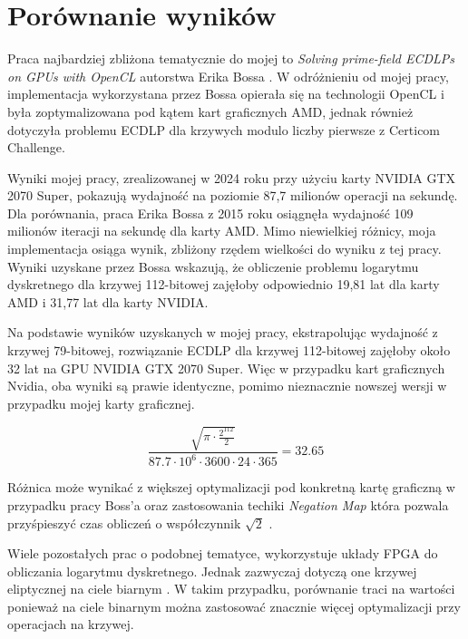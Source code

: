 \section{Porównanie wyników}

Praca najbardziej zbliżona tematycznie do mojej to \textit{Solving prime-field 
ECDLPs on GPUs with OpenCL} autorstwa Erika Bossa \cite{Boss2015}. W odróżnieniu 
od mojej pracy, implementacja wykorzystana przez Bossa opierała się na technologii 
OpenCL i była zoptymalizowana pod kątem kart graficznych AMD, jednak również 
dotyczyła problemu ECDLP dla krzywych modulo liczby pierwsze z Certicom Challenge.

Wyniki mojej pracy, zrealizowanej w 2024 roku przy użyciu karty NVIDIA GTX 2070 
Super, pokazują wydajność na poziomie 87,7 milionów operacji na sekundę. Dla 
porównania, praca Erika Bossa z 2015 roku osiągnęła wydajność 109 milionów iteracji 
na sekundę dla karty AMD.
Mimo niewielkiej różnicy, moja implementacja osiąga wynik, zbliżony rzędem wielkości do
wyniku z tej pracy.
Wyniki uzyskane przez Bossa wskazują, że obliczenie 
problemu logarytmu dyskretnego dla krzywej 112-bitowej zajęłoby odpowiednio 19,81 
lat dla karty AMD i 31,77 lat dla karty NVIDIA.

Na podstawie wyników uzyskanych w mojej pracy, ekstrapolując wydajność z krzywej 
79-bitowej, rozwiązanie ECDLP dla krzywej 112-bitowej zajęłoby około 32 lat na GPU 
NVIDIA GTX 2070 Super. Więc w przypadku kart graficznych Nvidia, oba wyniki są prawie identyczne,
pomimo nieznacznie nowszej wersji w przypadku mojej karty graficznej.

$$
\frac{\sqrt{\pi \cdot \frac{2^{112}}{2}}}{87.7 \cdot 10^{6} \cdot 3600 \cdot 24 \cdot 365} = 32.65
$$

Różnica może wynikać z większej optymalizacji pod konkretną kartę graficzną
w przypadku pracy Boss'a oraz zastosowania techiki \textit{Negation Map} która pozwala przyśpieszyć czas obliczeń
o współczynnik $\sqrt{2}$ \cite{Negation}.

Wiele pozostałych prac o podobnej tematyce,
wykorzystuje układy FPGA do obliczania logarytmu dyskretnego. Jednak zazwyczaj
dotyczą one krzywej eliptycznej na ciele biarnym \cite{Wenger2014}. W takim przypadku, porównanie traci na wartości
ponieważ na ciele binarnym można zastosować znacznie więcej optymalizacji przy operacjach na krzywej.